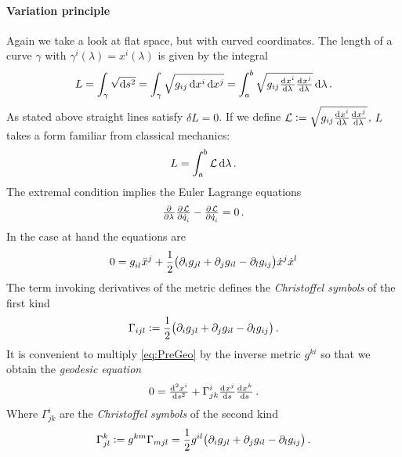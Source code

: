 \documentclass[
    a4paper,                                               %
    oneside,                                               %
    12pt,                                                  %
    headsepline,                                           %
    xcolor=dvipsnames
    ]{scrreprt}
\theoremstyle{definition}
\theoremstyle{remark}
\let\originalleft\left
\let\originalright\right
\renewcommand{\left}{\mathopen{}\mathclose\bgroup\originalleft}
\renewcommand{\right}{\aftergroup\egroup\originalright}
\begin{document}
    	\paragraph{Variation principle}
	     Again we take a look at flat space, but with curved coordinates. The length of a curve $\gamma$ with $\gamma^i(\lambda) = x^i(\lambda)$ is given by the integral
    	\begin{equation}
    	L=\int_{\gamma}\sqrt{\dif s^2} =\int_{\gamma}\sqrt{g_{ij}\dif x^i\dif x^j}=\int_{a}^{b}\sqrt{g_{ij}\od{x^i}{\lambda} \od{x^j}{\lambda}}\dif \lambda\, .
    	\end{equation}
		As stated above straight lines satisfy $\delta L = 0$. If we define $\mathcal{L}:=\sqrt{g_{ij}\od{x^i}{\lambda} \od{x^j}{\lambda}}$, $L$ takes a form familiar from classical mechanics:
		\begin{equation}
			L=\int_a^b \mathcal{L}\dif \lambda\, .
		\end{equation}
		The extremal condition implies the Euler Lagrange equations
		\begin{equation}
			\pd{}{\lambda}\pd{\mathcal{L}}{\dot{q}_i}-\pd{\mathcal{L}}{\dot{q}_i}
=0\, .		\end{equation} 
In the case at hand the equations are 
\begin{equation}
	0=\tensor{g}{_i_l}\tensor{\ddot{x}}{^j}+\frac{1}{2} \left(\partial_i g_{jl} + \partial_j g_{il} - \partial_l g_{ij}\right)\dot{x}^j\dot{x}^l \label{eq:PreGeo}
\end{equation}
The term invoking derivatives of the metric defines the \emph{Christoffel symbols} of the first kind
\begin{equation}
	\Gamma_{ijl}:=\frac{1}{2} \left(\partial_i g_{jl} + \partial_j g_{il} - \partial_l g_{ij}\right)\, .
\end{equation}
It is convenient to multiply \eqref{eq:PreGeo} by the inverse metric $g^{ki}$ so that we obtain the \emph{geodesic equation}
\begin{equation}
	0 = \od[2]{x^i}{s}+\Gamma^i_{jk}\od{x^j}{s}\od{x^k}{s}\, .
\end{equation}
Where $\Gamma^i_{jk}$ are the \emph{Christoffel symbols} of the second kind
\begin{equation}
	\Gamma^k_{jl}:=g^{km}\Gamma_{mjl}=\frac{1}{2}g^{il}\left(\partial_i g_{jl} + \partial_j g_{il} - \partial_l g_{ij}\right)\, .
\end{equation}
\end{document}
